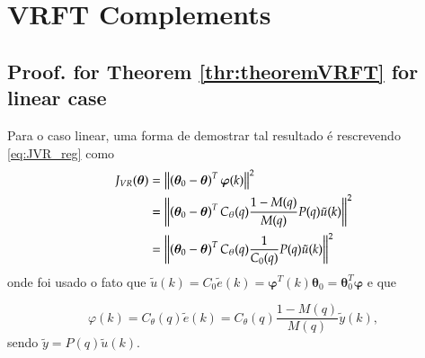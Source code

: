 
\chapter{VRFT Complements}\label{cap:AppA}

\section{Proof. for Theorem \ref{thr:theoremVRFT} for linear case}%
\label{sec:proof_linear}

Para o caso linear, uma forma de demostrar tal resultado é rescrevendo \eqref{eq:JVR_reg} como
%
\begin{align}
   \label{eq:JVRlin}
   J_{V R}(\bm{\theta}) &=\left\lVert\left(\bm{\theta}_0-\bm{\theta}\right)^T \bm{\varphi}(k)\right\rVert^{2} \nonumber\\
   &=\left\lVert\left(\bm{\theta}_{0}-\bm{\theta}\right)^T C_\theta(q) \frac{1-M(q)}{M(q)} P(q) \tilde{u}(k)\right\rVert^{2} \nonumber\\
   &=\left\lVert\left(\bm{\theta}_{0}-\bm{\theta}\right)^T C_\theta(q) \frac{1}{C_0(q)} P(q) \tilde{u}(k)\right\rVert^{2}
\end{align}
onde foi usado o fato que $\tilde{u}(k)=C_0\tilde{e}(k)=\bm{\varphi}^T(k)\bm{\theta}_0 = \bm{\theta}_0^T\bm{\varphi}$ e que 

\begin{equation}
   \varphi(k)=C_\theta(q) \tilde{e}(k)=C_\theta(q) \frac{1-M(q)}{M(q)} \tilde{y}(k),
\end{equation}
sendo $\tilde{y}=P(q)\tilde{u}(k)$.


